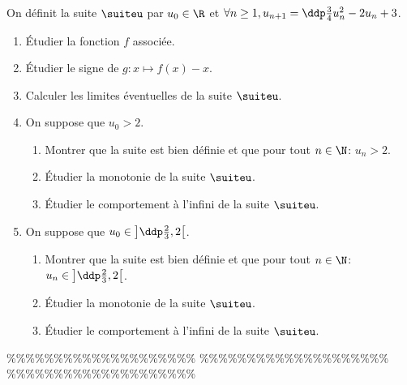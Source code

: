 



\begin{exercice} \;
On d\'efinit la suite $\suiteu$ par $u_0\in\R$ et $\forall n \geq 1, u_{n+1}=\ddp\frac{3}{4}u_n^2-2u_n+3$.
\begin{enumerate}
\item \'Etudier la fonction $f$ associ\'ee.
\item \'Etudier le signe de $g: x\mapsto f(x)-x$.
\item Calculer les limites \'eventuelles de la suite $\suiteu$.
\item On suppose que $u_0>2$.
\begin{enumerate}
\item Montrer que la suite est bien d\'efinie et que pour tout $n\in\N$: $u_n>2$.
\item \'Etudier la monotonie de la suite $\suiteu$.
\item \'Etudier le comportement \`{a} l'infini de la suite $\suiteu$.
\end{enumerate}
\item On suppose que $u_0\in\left\rbrack \ddp\frac{2}{3},2\right\lbrack $.
\begin{enumerate}
\item Montrer que la suite est bien d\'efinie et que pour tout $n\in\N$: $u_n\in\left\rbrack \ddp\frac{2}{3},2\right\lbrack$.
\item \'Etudier la monotonie de la suite $\suiteu$.
\item \'Etudier le comportement \`{a} l'infini de la suite $\suiteu$.
\end{enumerate} 
\end{enumerate}
\end{exercice}


\%\%\%\%\%\%\%\%\%\%\%\%\%\%\%\%\%\%\%\%
\%\%\%\%\%\%\%\%\%\%\%\%\%\%\%\%\%\%\%\%
\%\%\%\%\%\%\%\%\%\%\%\%\%\%\%\%\%\%\%\%





